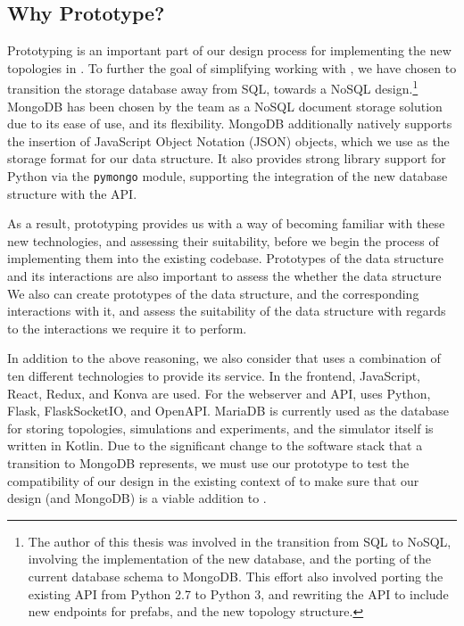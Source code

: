 \documentclass[11pt]{article}
\begin{document}
	\subsection{Why Prototype?}
		Prototyping is an important part of our design process for implementing the new topologies in \opendc{}.
		To further the goal of simplifying working with \opendc{}, we have chosen to transition the storage database away from SQL, towards a NoSQL design.\footnote{The author of this thesis was involved in the transition from SQL to NoSQL, involving the implementation of the new database, and the porting of the current database schema to MongoDB. 
		This effort also involved porting the existing \opendc{} API from Python 2.7 to Python 3, and rewriting the API to include new endpoints for prefabs, and the new topology structure.}
		MongoDB has been chosen by the \opendc{} team as a NoSQL document storage solution due to its ease of use, and its flexibility.
		MongoDB additionally natively supports the insertion of JavaScript Object Notation (JSON) objects, which we use as the storage format for our data structure.
		It also provides strong library support for Python via the \verb|pymongo| module, supporting the integration of the new database structure with the \opendc{} API.

		As a result, prototyping provides us with a way of becoming familiar with these new technologies, and assessing their suitability, before we begin the process of implementing them into the existing \opendc{} codebase.
		Prototypes of the data structure and its interactions are also important to assess the whether the data structure 
		We also can create prototypes of the data structure, and the corresponding interactions with it, and assess the suitability of the data structure with regards to the interactions we require it to perform.

		In addition to the above reasoning, we also consider that \opendc{} uses a combination of ten different technologies to provide its service.
		In the frontend, JavaScript, React, Redux, and Konva are used. For the webserver and API, \opendc{} uses Python, Flask, FlaskSocketIO, and OpenAPI.
		MariaDB is currently used as the database for storing topologies, simulations and experiments, and the simulator itself is written in Kotlin.
		Due to the significant change to the software stack that a transition to MongoDB represents, we must use our prototype to test the compatibility of our design in the existing context of \opendc{} to make sure that our design (and MongoDB) is a viable addition to \opendc{}.
\end{document}
